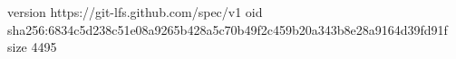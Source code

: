 version https://git-lfs.github.com/spec/v1
oid sha256:6834c5d238c51e08a9265b428a5c70b49f2c459b20a343b8e28a9164d39fd91f
size 4495
